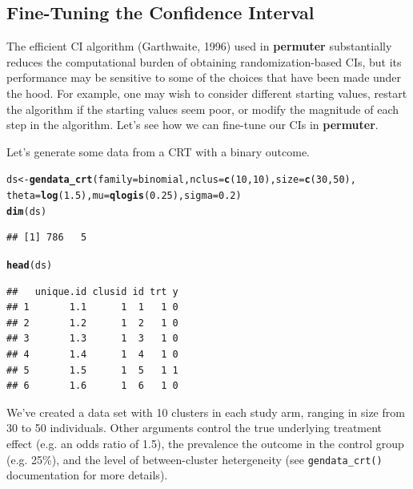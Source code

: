 \documentclass[12pt]{article}\usepackage[]{graphicx}\usepackage[]{color}
\makeatletter
\newcommand{\hlnum}[1]{\textcolor[rgb]{0.686,0.059,0.569}{#1}}%
\newcommand{\hlstd}[1]{\textcolor[rgb]{0.345,0.345,0.345}{#1}}%
\newcommand{\hlkwb}[1]{\textcolor[rgb]{0.69,0.353,0.396}{#1}}%
\newcommand{\hlkwc}[1]{\textcolor[rgb]{0.333,0.667,0.333}{#1}}%
\newcommand{\hlkwd}[1]{\textcolor[rgb]{0.737,0.353,0.396}{\textbf{#1}}}%
\newenvironment{kframe}{%
 \def\at@end@of@kframe{}%
 \ifinner\ifhmode%
  \def\at@end@of@kframe{\end{minipage}}%
  \begin{minipage}{\columnwidth}%
 \fi\fi%
 \def\FrameCommand##1{\hskip\@totalleftmargin \hskip-\fboxsep
 \colorbox{shadecolor}{##1}\hskip-\fboxsep
     \hskip-\linewidth \hskip-\@totalleftmargin \hskip\columnwidth}%
 \MakeFramed {\advance\hsize-\width
   \@totalleftmargin\z@ \linewidth\hsize
   \@setminipage}}%
 {\par\unskip\endMakeFramed%
 \at@end@of@kframe}
\newenvironment{knitrout}{}{} %
\makeatother
\begin{document}
\subsection{Fine-Tuning the Confidence Interval}
The efficient CI algorithm (Garthwaite, 1996) used in \textbf{permuter} substantially reduces the computational burden of obtaining randomization-based CIs, but its performance may be sensitive to some of the choices that have been made under the hood. For example, one may wish to consider different starting values, restart the algorithm if the starting values seem poor, or modify the magnitude of each step in the algorithm. Let's see how we can fine-tune our CIs in \textbf{permuter}.

Let's generate some data from a CRT with a binary outcome.
\begin{knitrout}
\color{fgcolor}\begin{kframe}
\begin{alltt}
\hlstd{ds} \hlkwb{<-} \hlkwd{gendata_crt}\hlstd{(}\hlkwc{family} \hlstd{= binomial,} \hlkwc{nclus} \hlstd{=} \hlkwd{c}\hlstd{(}\hlnum{10}\hlstd{,} \hlnum{10}\hlstd{),} \hlkwc{size} \hlstd{=} \hlkwd{c}\hlstd{(}\hlnum{30}\hlstd{,} \hlnum{50}\hlstd{),}
                  \hlkwc{theta} \hlstd{=} \hlkwd{log}\hlstd{(}\hlnum{1.5}\hlstd{),} \hlkwc{mu} \hlstd{=} \hlkwd{qlogis}\hlstd{(}\hlnum{0.25}\hlstd{),} \hlkwc{sigma} \hlstd{=} \hlnum{0.2}\hlstd{)}
\hlkwd{dim}\hlstd{(ds)}
\end{alltt}
\begin{verbatim}
## [1] 786   5
\end{verbatim}
\begin{alltt}
\hlkwd{head}\hlstd{(ds)}
\end{alltt}
\begin{verbatim}
##   unique.id clusid id trt y
## 1       1.1      1  1   1 0
## 2       1.2      1  2   1 0
## 3       1.3      1  3   1 0
## 4       1.4      1  4   1 0
## 5       1.5      1  5   1 1
## 6       1.6      1  6   1 0
\end{verbatim}
\end{kframe}
\end{knitrout}
We've created a data set with 10 clusters in each study arm, ranging in size from 30 to 50 individuals. Other arguments control the true underlying treatment effect (e.g. an odds ratio of 1.5), the prevalence the outcome in the control group (e.g. 25\%), and the level of between-cluster hetergeneity (see \texttt{gendata\_crt()} documentation for more details).
\end{document}
